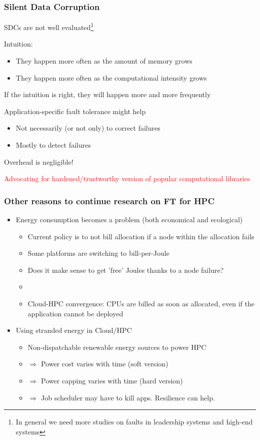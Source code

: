 \begin{frame}
  \frametitle{Silent Data Corruption}

  SDCs are not well evaluated\footnote{In general we need more studies on faults in leadership systems and high-end systems}

  Intuition:
  \begin{itemize}
  \item They happen more often as the amount of memory grows
  \item They happen more often as the computational intensity grows
  \end{itemize}

  If the intuition is right, they will happen more and more frequently

  Application-specific fault tolerance might help
  \begin{itemize}
  \item Not necessarily (or not only) to correct failures
  \item Mostly to detect failures
  \end{itemize}

  Overhead is negligible!

  \begin{center}
    \textcolor{red}{Advocating for hardened/trustworthy version of popular computational libraries}
  \end{center}  
\end{frame}

\begin{frame}
  \frametitle{Other reasons to continue research on FT for HPC}

  \begin{itemize}
  \item Energy consumption becomes a problem (both economical and ecological)
    \begin{itemize}
    \item Current policy is to not bill allocation if a node within the allocation fails
    \item Some platforms are switching to bill-per-Joule
    \item Does it make sense to get 'free' Joules thanks to a node failure?
    \item[] ~
    \item Cloud-HPC convergence: CPUs are billed as soon as allocated, even if the application cannot be deployed
    \end{itemize}
  \item Using stranded energy in Cloud/HPC
    \begin{itemize}
    \item Non-dispatchable renewable energy sources to power HPC
    \item $\Rightarrow$ Power cost varies with time (soft version)
    \item $\Rightarrow$ Power capping varies with time (hard version)
    \item $\Rightarrow$ Job scheduler may have to kill apps. Resilience can help.
    \end{itemize}
  \end{itemize}
\end{frame}

